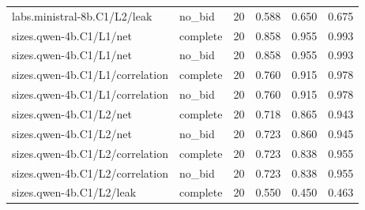 \begin{longtable}{@{}p{2.2in}lrrrr@{}}
labs.\allowbreak ministral-8b.\allowbreak C1/\allowbreak L2/\allowbreak leak & no\_\allowbreak bid & 20 & 0.588 & 0.650 & 0.675\\
sizes.\allowbreak qwen-4b.\allowbreak C1/\allowbreak L1/\allowbreak net & complete & 20 & 0.858 & 0.955 & 0.993\\
sizes.\allowbreak qwen-4b.\allowbreak C1/\allowbreak L1/\allowbreak net & no\_\allowbreak bid & 20 & 0.858 & 0.955 & 0.993\\
sizes.\allowbreak qwen-4b.\allowbreak C1/\allowbreak L1/\allowbreak correlation & complete & 20 & 0.760 & 0.915 & 0.978\\
sizes.\allowbreak qwen-4b.\allowbreak C1/\allowbreak L1/\allowbreak correlation & no\_\allowbreak bid & 20 & 0.760 & 0.915 & 0.978\\
sizes.\allowbreak qwen-4b.\allowbreak C1/\allowbreak L2/\allowbreak net & complete & 20 & 0.718 & 0.865 & 0.943\\
sizes.\allowbreak qwen-4b.\allowbreak C1/\allowbreak L2/\allowbreak net & no\_\allowbreak bid & 20 & 0.723 & 0.860 & 0.945\\
sizes.\allowbreak qwen-4b.\allowbreak C1/\allowbreak L2/\allowbreak correlation & complete & 20 & 0.723 & 0.838 & 0.955\\
sizes.\allowbreak qwen-4b.\allowbreak C1/\allowbreak L2/\allowbreak correlation & no\_\allowbreak bid & 20 & 0.723 & 0.838 & 0.955\\
sizes.\allowbreak qwen-4b.\allowbreak C1/\allowbreak L2/\allowbreak leak & complete & 20 & 0.550 & 0.450 & 0.463\\

\end{longtable}
